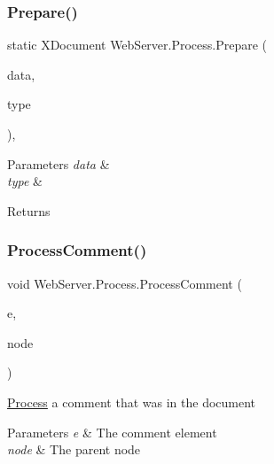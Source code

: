 \subsubsection{\texorpdfstring{Prepare()}{Prepare()}}
{\footnotesize\ttfamily static X\+Document Web\+Server.\+Process.\+Prepare (\begin{DoxyParamCaption}\item[{string}]{data,  }\item[{string}]{type }\end{DoxyParamCaption})\hspace{0.3cm}{\ttfamily [static]}, {\ttfamily [private]}}






\begin{DoxyParams}{Parameters}
{\em data} & \\
\hline
{\em type} & \\
\hline
\end{DoxyParams}
\begin{DoxyReturn}{Returns}

\end{DoxyReturn}
\mbox{\label{class_web_server_1_1_process_a556b06df908a3a180ffa037846aaa1a6}} 
\subsubsection{\texorpdfstring{Process\+Comment()}{ProcessComment()}}
{\footnotesize\ttfamily void Web\+Server.\+Process.\+Process\+Comment (\begin{DoxyParamCaption}\item[{X\+Comment}]{e,  }\item[{\hyperlink{class_web_server_1_1_node}{Node}}]{node }\end{DoxyParamCaption})\hspace{0.3cm}{\ttfamily [private]}}



\hyperlink{class_web_server_1_1_process}{Process} a comment that was in the document 


\begin{DoxyParams}{Parameters}
{\em e} & The comment element\\
\hline
{\em node} & The parent node\\
\hline
\end{DoxyParams}
\mbox{\label{class_web_server_1_1_process_a1e01d70b31479a65280fbfbab855861b}} 
